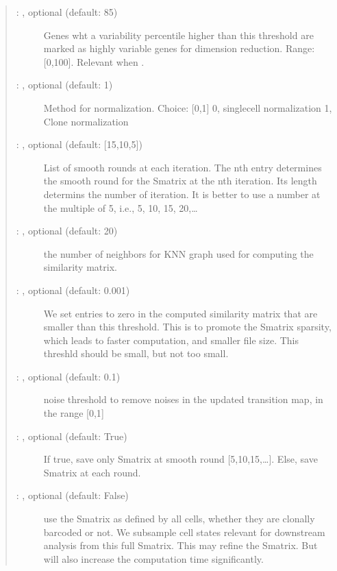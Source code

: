 \documentclass[letterpaper,10pt,english]{sphinxmanual}
\begin{document}
\begin{fulllineitems}
\begin{quote}
\begin{description}
\begin{description}
\item[{ : , optional (default: 85)}] \leavevmode
Genes wht a variability percentile higher than this threshold are marked as
highly variable genes for dimension reduction. Range: {[}0,100{]}.
Relevant when .

\item[{ : , optional (default: 1)}] \leavevmode
Method for normalization. Choice: {[}0,1{]}
0, single\sphinxhyphen{}cell normalization
1, Clone normalization

\item[{ : , optional (default: {[}15,10,5{]})}] \leavevmode
List of smooth rounds at each iteration.
The n\sphinxhyphen{}th entry determines the smooth round for the Smatrix
at the n\sphinxhyphen{}th iteration. Its length determins the number of
iteration. It is better to use a number at the multiple of
5, i.e., 5, 10, 15, 20,…

\item[{ : , optional (default: 20)}] \leavevmode
the number of neighbors for KNN graph used for computing the similarity matrix.

\item[{ : , optional (default: 0.001)}] \leavevmode
We set entries to zero in the computed similarity matrix that
are smaller than this threshold. This is to promote the Smatrix sparsity, which
leads to faster computation, and smaller file size.
This threshld should be small, but not too small.

\item[{ : , optional (default: 0.1)}] \leavevmode
noise threshold to remove noises in the updated transition map,
in the range {[}0,1{]}

\item[{ : , optional (default: True)}] \leavevmode
If true, save only Smatrix at smooth round {[}5,10,15,…{]}.
Else, save Smatrix at each round.

\item[{ : , optional (default: False)}] \leavevmode
use the Smatrix as defined by all cells, whether they are clonally
barcoded or not. We sub\sphinxhyphen{}sample cell states relevant for downstream
analysis from this full Smatrix. This may refine the Smatrix.
But will also increase the computation time significantly.


\end{description}
\end{description}
\end{quote}
\end{fulllineitems}
\end{document}

